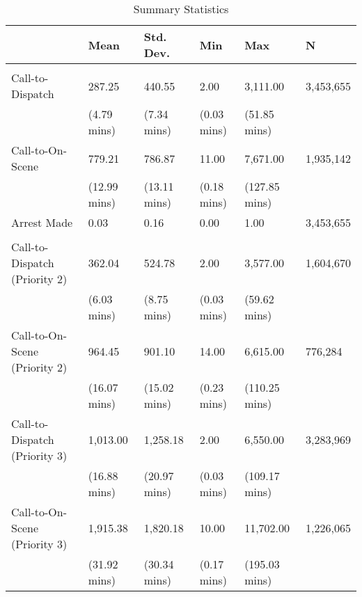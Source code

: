 \begin{table}[H]
\centering
\caption{\label{summary_stats}Summary Statistics}
\centering
\fontsize{10}{12}\selectfont
\begin{threeparttable}
\begin{tabular}[t]{llllll}
\toprule
  & Mean & Std. Dev. & Min & Max & N\\
\midrule
\addlinespace[0.3em]
\multicolumn{6}{l}{\textbf{Panel A: Priority 1 Outcomes:}}\\
\hspace{1em}Call-to-Dispatch & 287.25 & 440.55 & 2.00 & 3,111.00 & 3,453,655\\
\hspace{1em} & (4.79 mins) & (7.34 mins) & (0.03 mins) & (51.85 mins) & \\
\hspace{1em}Call-to-On-Scene & 779.21 & 786.87 & 11.00 & 7,671.00 & 1,935,142\\
\hspace{1em} & (12.99 mins) & (13.11 mins) & (0.18 mins) & (127.85 mins) & \\
\hspace{1em}Arrest Made & 0.03 & 0.16 & 0.00 & 1.00 & 3,453,655\\
\addlinespace[0.5cm]
\multicolumn{6}{l}{\textbf{Panel B: Secondary Outcomes:}}\\
\hspace{1em}Call-to-Dispatch (Priority 2) & 362.04 & 524.78 & 2.00 & 3,577.00 & 1,604,670\\
\hspace{1em} & (6.03 mins) & (8.75 mins) & (0.03 mins) & (59.62 mins) & \\
\hspace{1em}Call-to-On-Scene (Priority 2) & 964.45 & 901.10 & 14.00 & 6,615.00 & 776,284\\
\hspace{1em} & (16.07 mins) & (15.02 mins) & (0.23 mins) & (110.25 mins) & \\
\hspace{1em}Call-to-Dispatch (Priority 3) & 1,013.00 & 1,258.18 & 2.00 & 6,550.00 & 3,283,969\\
\hspace{1em} & (16.88 mins) & (20.97 mins) & (0.03 mins) & (109.17 mins) & \\
\hspace{1em}Call-to-On-Scene (Priority 3) & 1,915.38 & 1,820.18 & 10.00 & 11,702.00 & 1,226,065\\
\hspace{1em} & (31.92 mins) & (30.34 mins) & (0.17 mins) & (195.03 mins) & \\

\end{tabular}
\end{threeparttable}
\end{table}
